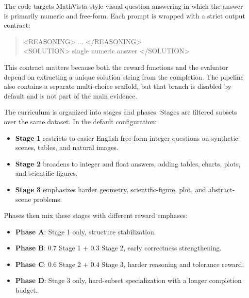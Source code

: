 \documentclass{article} %
\begin{document}
The code targets MathVista-style visual question answering in which the answer is primarily numeric and free-form. Each prompt is wrapped with a strict output contract:
\begin{quote}
\small\ttfamily
<REASONING> ... </REASONING>\\
<SOLUTION> single numeric answer </SOLUTION>
\end{quote}
This contract matters because both the reward functions and the evaluator depend on extracting a unique solution string from the completion. The pipeline also contains a separate multi-choice scaffold, but that branch is disabled by default and is not part of the main evidence.

The curriculum is organized into stages and phases. Stages are filtered subsets over the same dataset. In the default configuration:
\begin{itemize}[leftmargin=1.2em]
\item \textbf{Stage 1} restricts to easier English free-form integer questions on synthetic scenes, tables, and natural images.
\item \textbf{Stage 2} broadens to integer and float answers, adding tables, charts, plots, and scientific figures.
\item \textbf{Stage 3} emphasizes harder geometry, scientific-figure, plot, and abstract-scene problems.
\end{itemize}
Phases then mix these stages with different reward emphases:
\begin{itemize}[leftmargin=1.2em]
\item \textbf{Phase A}: Stage 1 only, structure stabilization.
\item \textbf{Phase B}: $0.7$ Stage 1 + $0.3$ Stage 2, early correctness strengthening.
\item \textbf{Phase C}: $0.6$ Stage 2 + $0.4$ Stage 3, harder reasoning and tolerance reward.
\item \textbf{Phase D}: Stage 3 only, hard-subset specialization with a longer completion budget.
\end{itemize}
\end{document}
